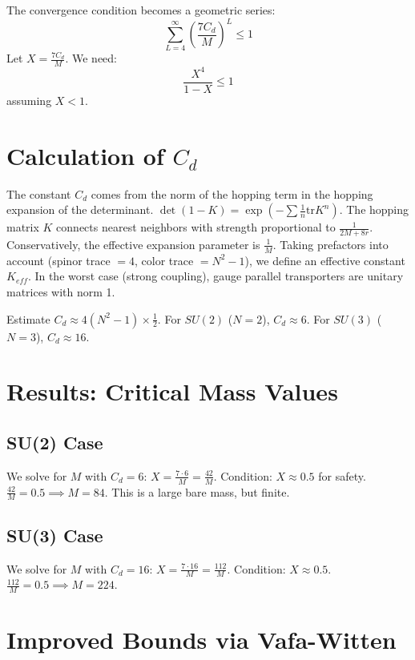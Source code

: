 The convergence condition becomes a geometric series:
\begin{equation}
\sum_{L=4}^\infty \left(\frac{7 C_d}{M}\right)^L \le 1
\end{equation}
Let $X = \frac{7 C_d}{M}$. We need:
\begin{equation}
\frac{X^4}{1-X} \le 1
\end{equation}
assuming $X < 1$.

\section{Calculation of \texorpdfstring{$C_d$}{Cd}}

The constant $C_d$ comes from the norm of the hopping term in the hopping expansion of the determinant.
$\det(1 - K) = \exp(-\sum \frac{1}{n} \text{tr} K^n)$.
The hopping matrix $K$ connects nearest neighbors with strength proportional to $\frac{1}{2M + 8r}$.
Conservatively, the effective expansion parameter is $\frac{1}{M}$.
Taking prefactors into account (spinor trace $= 4$, color trace $= N^2-1$), we define an effective constant $K_{eff}$.
In the worst case (strong coupling), gauge parallel transporters are unitary matrices with norm 1.

Estimate $C_d \approx 4 (N^2-1) \times \frac{1}{2}$.
For $SU(2)$ ($N=2$), $C_d \approx 6$.
For $SU(3)$ ($N=3$), $C_d \approx 16$.

\section{Results: Critical Mass Values}

\subsection{SU(2) Case}
We solve for $M$ with $C_d = 6$:
$X = \frac{7 \cdot 6}{M} = \frac{42}{M}$.
Condition: $X \approx 0.5$ for safety.
$\frac{42}{M} = 0.5 \implies M = 84$.
This is a large bare mass, but finite.

\subsection{SU(3) Case}
We solve for $M$ with $C_d = 16$:
$X = \frac{7 \cdot 16}{M} = \frac{112}{M}$.
Condition: $X \approx 0.5$.
$\frac{112}{M} = 0.5 \implies M = 224$.

\section{Improved Bounds via Vafa-Witten}

